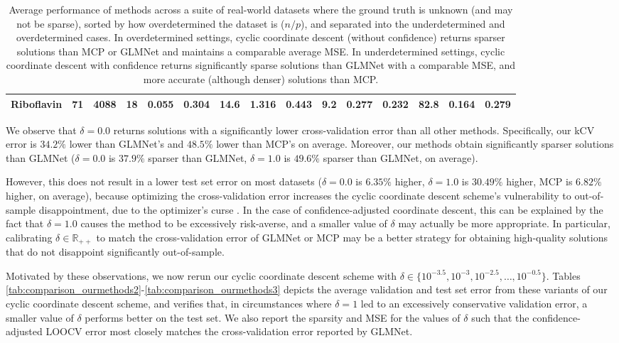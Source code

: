\documentclass[mnsc,nonblindrev]{informs3} %
\let\footnote=\endnote
\begin{document}
\begin{table}[h]
\begin{tabular}{@{}l r r r r r r r r r r r r r r@{}}
Riboflavin & 71 & 4088 & 18 & 0.055 & 0.304 & 14.6 & 1.316 & 0.443 & 9.2 & 0.277 & 0.232 & 82.8 & 0.164 & 0.279\\
\bottomrule
\end{tabular}
\caption{Average performance of methods across a suite of real-world datasets where the ground truth is unknown (and may not be sparse), sorted by how overdetermined the dataset is ($n/p$), and separated into the underdetermined and overdetermined cases. In overdetermined settings, cyclic coordinate descent (without confidence) returns sparser solutions than MCP or GLMNet and maintains a comparable average MSE. In underdetermined settings, cyclic coordinate descent with confidence returns significantly sparse solutions than GLMNet with a comparable MSE, and more accurate (although denser) solutions than MCP.
}
\label{tab:comparison_ourmethods}
\end{table}


We observe that $\delta=0.0$ returns solutions with a significantly lower cross-validation error than all other methods. Specifically, our kCV error is $34.2\%$ lower than GLMNet's and $48.5\%$ lower than MCP's on average. %
Moreover, our methods obtain significantly sparser solutions than GLMNet ($\delta=0.0$ is $37.9\%$ sparser than GLMNet, $\delta=1.0$ is $49.6\%$ sparser than GLMNet, on average).

However, this does not result in a lower test set error on most datasets ($\delta=0.0$ is $6.35\%$ higher, $\delta=1.0$ is $30.49\%$ higher, MCP is $6.82\%$ higher, on average), because optimizing the cross-validation error increases the cyclic coordinate descent scheme's vulnerability to out-of-sample disappointment, due to the optimizer's curse \citep{smith2006optimizer}. In the case of confidence-adjusted coordinate descent, this can be explained by the fact that $\delta=1.0$ causes the method to be excessively risk-averse, and a smaller value of $\delta$ may actually be more appropriate. In particular, calibrating $\delta \in \mathbb{R}_{++}$ to match the cross-validation error of GLMNet or MCP may be a better strategy for obtaining high-quality solutions that do not disappoint significantly out-of-sample.%

Motivated by these observations, we now rerun our cyclic coordinate descent scheme with $\delta \in \{10^{-3.5}, 10^{-3}, 10^{-2.5}, \ldots, 10^{-0.5}\}$. Tables \ref{tab:comparison_ourmethods2}-\ref{tab:comparison_ourmethods3} depicts the average validation and test set error from these variants of our cyclic coordinate descent scheme, and verifies that, in circumstances where $\delta=1$ led to an excessively conservative validation error, a smaller value of $\delta$ performs better on the test set. We also report the sparsity and MSE for the values of $\delta$ such that the confidence-adjusted LOOCV error most closely matches the cross-validation error reported by GLMNet. %
\end{document}
